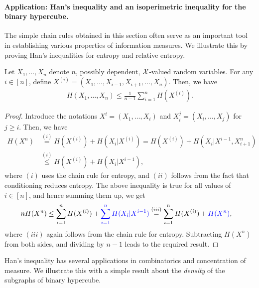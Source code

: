             \paragraph{Application: Han's inequality and an isoperimetric inequality for the binary hypercube.} The simple chain rules obtained in this section often serve as an important tool in establishing various properties of information measures. We illustrate this by proving Han's inequalities for entropy and relative entropy.  
            \begin{proposition}
                \label{prop:Hans-entropy} Let $X_1, \ldots, X_n$ denote $n$, possibly dependent, $\mathcal{X}$-valued random variables. For any $i \in [n]$, define $X^{(i)} = (X_1, \ldots, X_{i-1}, X_{i+1}, \ldots, X_n)$. Then, we have 
                \begin{align}
                    H(X_1, \ldots, X_n) \leq \frac{1}{n-1} \sum_{i=1}^n  H(X^{(i)}). 
                \end{align}
            \end{proposition}
            \begin{proof}
                Introduce the notations $X^i = (X_1, \ldots, X_i)$ and $X_i^j = (X_i, \ldots, X_j)$ for $j \geq i$. Then, we have 
                \begin{align}
                    H(X^n) &\stackrel{(i)}{=} H(X^{(i)}) + H(X_i|X^{(i)}) = H(X^{(i)}) + H(X_i|X^{i-1}, X_{i+1}^n) \\ 
                    & \stackrel{(i)}{\leq} H(X^{(i)}) + H(X_i|X^{i-1}), 
                \end{align}
                where $(i)$ uses the chain rule for entropy, and $(ii)$ follows from the fact that conditioning reduces entropy. The above inequality is true for all values of $i \in [n]$, and hence summing them up, we get 
                \begin{align}
                    n H(X^n) &\leq \sum_{i=1}^n H(X^{(i)}) + \textcolor{blue}{\sum_{i=1}^n H(X_i|X^{i-1})} 
                     \stackrel{(iii)}{=}  \sum_{i=1}^n H(X^{(i)}) + \textcolor{blue}{H(X^n)},  
                \end{align}
                where $(iii)$ again follows from the chain rule for entropy. Subtracting $H(X^n)$ from both sides, and dividing by $n-1$ leads to the required result. 
            \end{proof}
            Han's inequality has several applications in combinatorics and concentration of measure. We illustrate this with a simple result about the \emph{density} of the subgraphs of binary hypercube. 
